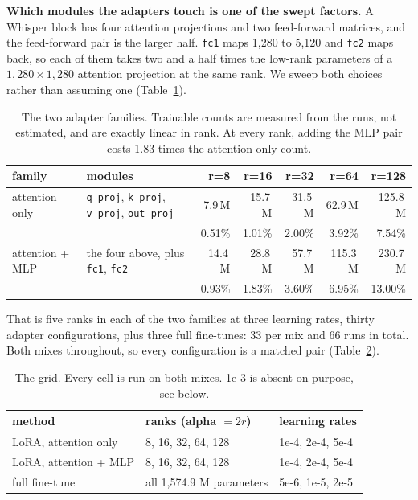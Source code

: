 \documentclass[preprint]{article}
\begin{document}
\textbf{Which modules the adapters touch is one of the swept factors.} A Whisper block has four
attention projections and two feed-forward matrices, and the feed-forward pair is the larger
half. \texttt{fc1} maps 1{,}280 to 5{,}120 and \texttt{fc2} maps back, so each of them takes
two and a half times the low-rank parameters of a $1{,}280 \times 1{,}280$ attention
projection at the same rank. We sweep both choices rather than assuming one
(Table~\ref{tab:targets}).

\begin{table}[!htbp]
\centering
\caption{The two adapter families. Trainable counts are measured from the runs, not estimated,
and are exactly linear in rank. At every rank, adding the MLP pair costs 1.83 times the
attention-only count.}
\label{tab:targets}
\footnotesize
\begin{tabular}{llrrrrr}
\toprule
\textbf{family} & \textbf{modules} & \textbf{r=8} & \textbf{r=16} & \textbf{r=32} & \textbf{r=64} & \textbf{r=128} \\
\midrule
attention only & \texttt{q\_proj}, \texttt{k\_proj}, \texttt{v\_proj}, \texttt{out\_proj}
 & 7.9\,M & 15.7\,M & 31.5\,M & 62.9\,M & 125.8\,M \\
 & & 0.51\% & 1.01\% & 2.00\% & 3.92\% & 7.54\% \\
\addlinespace[2pt]
attention + MLP & the four above, plus \texttt{fc1}, \texttt{fc2}
 & 14.4\,M & 28.8\,M & 57.7\,M & 115.3\,M & 230.7\,M \\
 & & 0.93\% & 1.83\% & 3.60\% & 6.95\% & 13.00\% \\
\bottomrule
\end{tabular}
\end{table}

That is five ranks in each of the two families at three learning rates, thirty adapter
configurations, plus three full fine-tunes: 33 per mix and 66 runs in total. Both mixes
throughout, so every configuration is a matched pair (Table~\ref{tab:grid}).

\begin{table}[!htbp]
\centering
\caption{The grid. Every cell is run on both mixes. 1e-3 is absent on purpose, see below.}
\label{tab:grid}
\footnotesize
\begin{tabular}{lll}
\toprule
\textbf{method} & \textbf{ranks (alpha $= 2r$)} & \textbf{learning rates} \\
\midrule
LoRA, attention only & 8, 16, 32, 64, 128 & 1e-4, 2e-4, 5e-4 \\
LoRA, attention + MLP & 8, 16, 32, 64, 128 & 1e-4, 2e-4, 5e-4 \\
full fine-tune & all 1{,}574.9 M parameters & 5e-6, 1e-5, 2e-5 \\
\bottomrule
\end{tabular}
\end{table}
\end{document}
